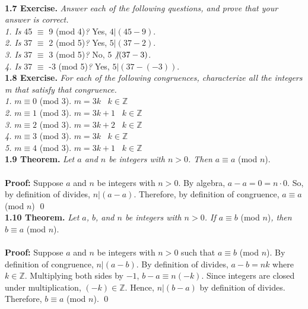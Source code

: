 \documentclass[12pt]{article}
\begin{document}
\newpage
~\\

\noindent \textbf{1.7 Exercise.} \emph{Answer each of the following questions, 
and prove that your answer is correct.}
~\\
\emph{1. Is} 45 $\equiv$ 9 (mod 4)\emph{?} Yes, $4 \vert (45 - 9)$. 
~\\
\emph{2. Is} 37 $\equiv$ 2 (mod 5)\emph{?} Yes, $5 \vert (37 - 2)$. 
~\\
\emph{3. Is} 37 $\equiv$ 3 (mod 5)\emph{?} No, $5 \not \vert (37 - 3)$. 
~\\
\emph{4. Is} 37 $\equiv$ -3 (mod 5)\emph{?} Yes, $5 \vert (37 - (-3))$. 
~\\

\noindent \textbf{1.8 Exercise.} \emph{For each of the following congruences, 
characterize all the integers m that satisfy that congruence.}
~\\
\emph{1.} $m \equiv 0$ (mod 3). \; $m = 3k \; \; \; k \in \mathbb{Z}$
~\\
\emph{2.} $m \equiv 1$ (mod 3). \; $m = 3k + 1 \; \; \; k \in \mathbb{Z}$
~\\
\emph{3.} $m \equiv 2$ (mod 3). \; $m = 3k + 2 \; \; \; k \in \mathbb{Z}$
~\\
\emph{4.} $m \equiv 3$ (mod 3). \; $m = 3k \; \; \; k \in \mathbb{Z}$
~\\
\emph{5.} $m \equiv 4$ (mod 3). \; $m = 3k + 1 \; \; \; k \in \mathbb{Z}$
~\\

\noindent \textbf{1.9 Theorem.} \emph{Let $a$ and $n$ be integers with $n > 0$.
Then $a \equiv a$} (mod $n$). 
~\\
~\\
\textbf{Proof:} 
Suppose $a$ and $n$ be integers with $n > 0$. By algebra, $a - a = 0 = n \cdot 0$. So, by definition of divides, $n \vert (a - a)$. Therefore, by definition of congruence, $a \equiv a$ (mod $n$)
\qed
~\\

\noindent \textbf{1.10 Theorem.} \emph{Let $a$, $b$, and $n$ be integers with $n>0$. 
If $a \equiv b$} (mod $n$)\emph{, then $b \equiv a$} (mod $n$).
~\\
~\\
\textbf{Proof:} 
Suppose $a$ and $n$ be integers with $n > 0$ such that $a \equiv b$ (mod $n$). By definition of congruence, $n \vert (a - b)$. By definition of divides, $a - b = nk$ where $k \in \mathbb{Z}$. Multiplying both sides by $-1$, $b - a \equiv n(-k)$. Since integers are closed under multiplication, $(-k) \in \mathbb{Z}$. Hence, $n \vert (b-a)$ by definition of divides. Therefore, $b \equiv a$ (mod $n$). 
 \qed
~\\
\end{document}
